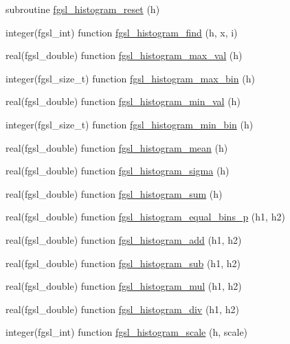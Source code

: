 \begin{DoxyCompactItemize}
\item 
subroutine \hyperlink{histogram_8finc_a49fea1a4cd3aea567784135c870153c1}{fgsl\-\_\-histogram\-\_\-reset} (h)
\item 
integer(fgsl\-\_\-int) function \hyperlink{histogram_8finc_a8c4b14ac540a9a068900fd3e35ee7159}{fgsl\-\_\-histogram\-\_\-find} (h, x, i)
\item 
real(fgsl\-\_\-double) function \hyperlink{histogram_8finc_aa210e74511fada1333cf9a7a4d8b2557}{fgsl\-\_\-histogram\-\_\-max\-\_\-val} (h)
\item 
integer(fgsl\-\_\-size\-\_\-t) function \hyperlink{histogram_8finc_ac32e63df5114b7157f1616e659988426}{fgsl\-\_\-histogram\-\_\-max\-\_\-bin} (h)
\item 
real(fgsl\-\_\-double) function \hyperlink{histogram_8finc_ab0fb2cc0ccc968ef2810a13320e08a0b}{fgsl\-\_\-histogram\-\_\-min\-\_\-val} (h)
\item 
integer(fgsl\-\_\-size\-\_\-t) function \hyperlink{histogram_8finc_a36924510341b52382469d95253f64918}{fgsl\-\_\-histogram\-\_\-min\-\_\-bin} (h)
\item 
real(fgsl\-\_\-double) function \hyperlink{histogram_8finc_a03754e56f78dcc887273fab1e8ac0b98}{fgsl\-\_\-histogram\-\_\-mean} (h)
\item 
real(fgsl\-\_\-double) function \hyperlink{histogram_8finc_a507669e9246974308454e7fa641a9211}{fgsl\-\_\-histogram\-\_\-sigma} (h)
\item 
real(fgsl\-\_\-double) function \hyperlink{histogram_8finc_a11059753ca12bf2c8f77900c47f3eb75}{fgsl\-\_\-histogram\-\_\-sum} (h)
\item 
real(fgsl\-\_\-double) function \hyperlink{histogram_8finc_a593970dbd233b22cc063121a4664ea41}{fgsl\-\_\-histogram\-\_\-equal\-\_\-bins\-\_\-p} (h1, h2)
\item 
real(fgsl\-\_\-double) function \hyperlink{histogram_8finc_ab700a51e118baabdd3fe4589a0083157}{fgsl\-\_\-histogram\-\_\-add} (h1, h2)
\item 
real(fgsl\-\_\-double) function \hyperlink{histogram_8finc_abac617a60f5a51da9555b6f2a8cedc87}{fgsl\-\_\-histogram\-\_\-sub} (h1, h2)
\item 
real(fgsl\-\_\-double) function \hyperlink{histogram_8finc_a1712b526a7c62831c9891515dd2193cd}{fgsl\-\_\-histogram\-\_\-mul} (h1, h2)
\item 
real(fgsl\-\_\-double) function \hyperlink{histogram_8finc_a28f472750d348b24111cf4090e079838}{fgsl\-\_\-histogram\-\_\-div} (h1, h2)
\item 
integer(fgsl\-\_\-int) function \hyperlink{histogram_8finc_a0d549e18c22aae049e46dae9417c90f0}{fgsl\-\_\-histogram\-\_\-scale} (h, scale)

\end{DoxyCompactItemize}
